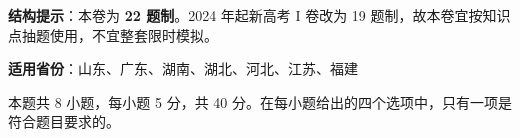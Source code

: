 

\begin{gknotice}
\textbf{结构提示}：本卷为 \textbf{22 题制}。2024 年起新高考 I 卷改为 19 题制，故本卷宜按知识点抽题使用，不宜整套限时模拟。

\textbf{适用省份}：山东、广东、湖南、湖北、河北、江苏、福建
\end{gknotice}

\par\medskip


\begin{gktip}
本题共 8 小题，每小题 5 分，共 40 分。在每小题给出的四个选项中，只有一项是符合题目要求的。
\end{gktip}

